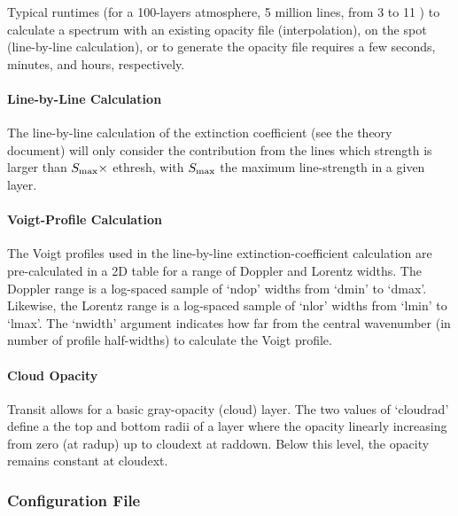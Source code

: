 \documentclass[letterpaper, 12pt]{article}
\begin{document}

Typical runtimes (for a 100-layers atmosphere, 5 million lines, from 3
to 11 {\microns}) to calculate a spectrum with an existing opacity
file (interpolation), on the spot (line-by-line calculation), or to
generate the opacity file requires a few seconds, minutes, and hours,
respectively.

\paragraph{Line-by-Line Calculation}

The line-by-line calculation of the extinction coefficient (see the
theory document) will only consider the contribution from the lines
which strength is larger than $S\sb{\rm max} \times$ {\tttb ethresh},
with $S\sb{\rm max}$ the maximum line-strength in a given layer.

\paragraph{Voigt-Profile Calculation}

The Voigt profiles used in the line-by-line extinction-coefficient
calculation are pre-calculated in a 2D table for a range of
Doppler and Lorentz widths.  The Doppler range is a log-spaced sample
of `{\tttb ndop}' widths from `{\tttb dmin}' to `{\tttb dmax}'.
Likewise, the Lorentz range is a log-spaced sample
of `{\tttb nlor}' widths from `{\tttb lmin}' to `{\tttb lmax}'.
The `{\tttm nwidth}' argument indicates how far from the central
wavenumber (in number of profile half-widths) to calculate the Voigt
profile.

\paragraph{Cloud Opacity}

Transit allows for a basic gray-opacity (cloud) layer.  The two values
of {\tttm `cloudrad'} define a the top and bottom radii of a layer
where the opacity linearly increasing from zero (at {\tttb radup}) up
to {\tttb cloudext} at {\tttb raddown}.  Below this level, the
opacity remains constant at {\tttb cloudext}.


\subsubsection{Configuration File}
\label{sec:transitcfg}
\end{document}
